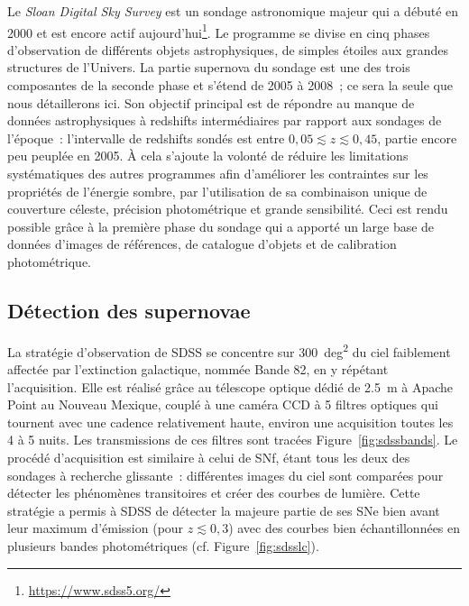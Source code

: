 \documentclass[../main/main.tex]{subfiles}
\begin{document}
Le \textit{Sloan Digital Sky Survey} \citep[SDSS,][]{frieman2008, sako2008,
sako2018} est un sondage astronomique majeur qui a débuté en 2000 et est encore
actif
aujourd'hui\footnote{\href{https://www.sdss5.org/}{https://www.sdss5.org/}}. Le
programme se divise en cinq phases d'observation de différents objets
astrophysiques, de simples étoiles aux grandes structures de l'Univers. La
partie supernova du sondage est une des trois composantes de la seconde phase et
s'étend de 2005 à 2008~; ce sera la seule que nous détaillerons ici. Son
objectif principal est de répondre au manque de données astrophysiques à
redshifts intermédiaires par rapport aux sondages de l'époque~: l'intervalle de
redshifts sondés est entre $0,05 \lesssim z \lesssim 0,45$, partie encore peu
peuplée en 2005. À cela s'ajoute la volonté de réduire les limitations
systématiques des autres programmes afin d'améliorer les contraintes sur les
propriétés de l'énergie sombre, par l'utilisation de sa combinaison unique de
couverture céleste, précision photométrique et grande sensibilité. Ceci est
rendu possible grâce à la première phase du sondage qui a apporté un large base
de données d'images de références, de catalogue d'objets et de calibration
photométrique.

\subsection{Détection des supernovae}\label{ssec:sdssdetec}

La stratégie d'observation de SDSS se concentre sur \SI{300}{deg^2} du ciel
faiblement affectée par l'extinction galactique, nommée Bande 82, en y répétant
l'acquisition. Elle est réalisé grâce au télescope optique dédié de \SI{2,5}{m}
\citep{gunn2006} à Apache Point au Nouveau Mexique, couplé à une caméra CCD
\citep{gunn1998} à 5 filtres optiques \citep[$ugriz$,][]{fukugita1996} qui
tournent avec une cadence relativement haute, environ une acquisition toutes les
4 à 5 nuits. Les transmissions de ces filtres sont tracées
Figure~\ref{fig:sdssbands}. Le procédé d'acquisition est similaire à celui de
SNf, étant tous les deux des sondages à recherche glissante~: différentes images
du ciel sont comparées pour détecter les phénomènes transitoires et créer des
courbes de lumière. Cette stratégie a permis à SDSS de détecter la majeure
partie de ses SNe bien avant leur maximum d'émission (pour $z \lesssim 0,3$)
avec des courbes bien échantillonnées en plusieurs bandes photométriques (cf.
Figure~\ref{fig:sdsslc}).
\end{document}
